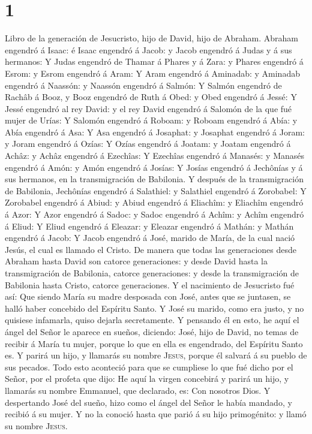 \hypertarget{section}{%
\section{1}\label{section}}

 Libro de la generación de Jesucristo, hijo de David, hijo
de Abraham.  Abraham engendró á Isaac: é Isaac engendró á
Jacob: y Jacob engendró á Judas y á sus hermanos:  Y Judas
engendró de Thamar á Phares y á Zara: y Phares engendró á Esrom: y Esrom
engendró á Aram:  Y Aram engendró á Aminadab: y Aminadab
engendró á Naassón: y Naassón engendró á Salmón:  Y Salmón
engendró de Rachâb á Booz, y Booz engendró de Ruth á Obed: y Obed
engendró á Jessé:  Y Jessé engendró al rey David: y el rey
David engendró á Salomón de la que fué mujer de Urías:  Y
Salomón engendró á Roboam: y Roboam engendró á Abía: y Abía engendró á
Asa:  Y Asa engendró á Josaphat: y Josaphat engendró á
Joram: y Joram engendró á Ozías:  Y Ozías engendró á
Joatam: y Joatam engendró á Achâz: y Achâz engendró á Ezechîas:
 Y Ezechîas engendró á Manasés: y Manasés engendró á
Amón: y Amón engendró á Josías:  Y Josías engendró á
Jechônías y á sus hermanos, en la transmigración de Babilonia.
 Y después de la transmigración de Babilonia, Jechônías
engendró á Salathiel: y Salathiel engendró á Zorobabel: 
Y Zorobabel engendró á Abiud: y Abiud engendró á Eliachîm: y Eliachîm
engendró á Azor:  Y Azor engendró á Sadoc: y Sadoc
engendró á Achîm: y Achîm engendró á Eliud:  Y Eliud
engendró á Eleazar: y Eleazar engendró á Mathán: y Mathán engendró á
Jacob:  Y Jacob engendró á José, marido de María, de la
cual nació Jesús, el cual es llamado el Cristo.  De
manera que todas las generaciones desde Abraham hasta David son catorce
generaciones: y desde David hasta la transmigración de Babilonia,
catorce generaciones: y desde la transmigración de Babilonia hasta
Cristo, catorce generaciones.  Y el nacimiento de
Jesucristo fué así: Que siendo María su madre desposada con José, antes
que se juntasen, se halló haber concebido del Espíritu Santo.
 Y José su marido, como era justo, y no quisiese
infamarla, quiso dejarla secretamente.  Y pensando él en
esto, he aquí el ángel del Señor le aparece en sueños, diciendo: José,
hijo de David, no temas de recibir á María tu mujer, porque lo que en
ella es engendrado, del Espíritu Santo es.  Y parirá un
hijo, y llamarás su nombre \textsc{Jesus}, porque él salvará á su pueblo
de sus pecados.  Todo esto aconteció para que se
cumpliese lo que fué dicho por el Señor, por el profeta que dijo:
 He aquí la virgen concebirá y parirá un hijo, y llamarás
su nombre Emmanuel, que declarado, es: Con nosotros Dios.
 Y despertando José del sueño, hizo como el ángel del
Señor le había mandado, y recibió á su mujer.  Y no la
conoció hasta que parió á su hijo primogénito: y llamó su nombre
\textsc{Jesus}.

